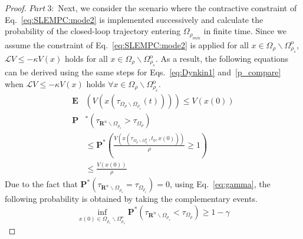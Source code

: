 \documentclass[letterpaper, 10pt, conference]{ieeeconf}
\begin{document}
\begin{proof}
$Part ~3:$ Next, we consider the scenario where the contractive constraint of Eq.~\ref{eq:SLEMPC:mode2} is implemented successively and calculate the probability of the closed-loop trajectory entering $\Omega_{\rho_{min}}$ in finite time. Since we assume the constraint of Eq.~\ref{eq:SLEMPC:mode2} is applied for all $x \in \Omega_{\rho} \backslash \Omega_{\rho_s}^{\text{o}}$, $\mathcal{L}V \leq -\kappa V(x)$ holds for all $x \in \Omega_{\rho} \backslash \Omega_{\rho_s}^{\text{o}}$. As a result, the following equations can be derived using the same steps for Eqs.~\ref{eq:Dynkin1} and~\ref{p_compare} when $\mathcal{L}V \leq -\kappa V(x)$ holds $\forall x \in \Omega_{\rho} \backslash \Omega_{\rho_e}^{\text{o}} $.
\begin{subequations}\label{eq:Dynkin2}
	\begin{align}
\mathbf{E}&(V(x(\tau_{\Omega_{\rho} \backslash \Omega_{\rho_s}}(t)))) \leq V(x(0))\\
\mathbf{P}&^*(\tau_{\mathbf{R}^n \backslash \Omega_{\rho_s}} > \tau_{\Omega_{\rho}}   ) \nonumber\\
&\leq \mathbf{P}^*(\frac{V(x(\tau_{\Omega_{\rho} \backslash \Omega_{\rho_s}^{\text{o}}},t_0,x(0)))}{\rho} \geq 1)\nonumber\\
& \leq \frac{V(x(0))}{\rho}
\end{align}
\end{subequations}
Due to the fact that $\mathbf{P}^*(\tau_{\mathbf{R}^n \backslash \Omega_{\rho_s}} = \tau_{\Omega_{\rho_e}} ) = 0$, using Eq.~\ref{eq:gamma}, the following probability is obtained by taking the complementary events.
\begin{equation}\label{eq:gamma_eqn}
\inf_{x(0) \in \Omega_{\rho_e} \backslash \Omega_{\rho_s}^{\text{o}}} \mathbf{P}^*(\tau_{\mathbf{R}^n \backslash \Omega_{\rho_s}} < \tau_{\Omega_{\rho} }) \geq 1-\gamma
\end{equation}		


\end{proof}
\end{document}
